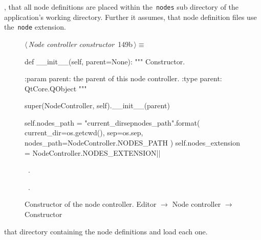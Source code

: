 \documentclass[%
    a4paper,    %
    justified,  %
    nobib,      %
    openany     %
]{tufte-book}
\makeatletter
\renewcommand{\label}[1]{\@tufte@label{##1}}%
\makeatother
\begin{document}
, that all node definitions are placed
within the~\verb=nodes= sub directory of the application's working directory.
Further it assumes, that node definition files use the~\verb=node= extension.

\begin{figure}[!htbp]
\begin{flushleft} \small
\begin{minipage}{\linewidth}\label{scrap106}\raggedright\small
{} $\langle\,${\itshape Node controller constructor}\nobreak\ {\footnotesize {149b}}$\,\rangle\equiv$
\vspace{-1ex}
\begin{pythoncode}
def __init__(self, parent=None):
    """ Constructor. 

    :param parent: the parent of this node controller.
    :type  parent: QtCore.QObject
    """

    super(NodeController, self).__init__(parent)

    self.nodes_path = "{current_dir}{sep}{nodes_path}".format(
        current_dir=os.getcwd(),
        sep=os.sep,
        nodes_path=NodeController.NODES_PATH
    )
    self.nodes_extension = NodeController.NODES_EXTENSION|\NWsep|
\end{pythoncode}
\vspace{1.5ex}
\footnotesize
\begin{list}{}{\setlength{\itemsep}{-\parsep}\setlength{\itemindent}{-\leftmargin}}
\item \NWtxtMacroDefBy\ .
\item \NWtxtMacroRefIn\ .

\item{}
\end{list}
\end{minipage}\vspace{4ex}
\end{flushleft}
\caption{Constructor of the node controller.
  \newline{}\newline{}Editor $\rightarrow$ Node controller $\rightarrow$
  Constructor}
\end{figure}

 that directory containing the
node definitions and load each one.
\end{document}
